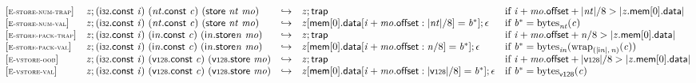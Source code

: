 $$
\begin{array}{@{}l@{}lcl@{}l@{}}
{[\textsc{\scriptsize E{-}store{-}num{-}trap}]} \quad & {\mathit{z}} ; (\mathsf{i{\scriptstyle32}}.\mathsf{const}~{\mathit{i}})~({\mathit{nt}}.\mathsf{const}~{\mathit{c}})~(\mathsf{store}~{\mathit{nt}}~{\mathit{mo}}) &\hookrightarrow& {\mathit{z}} ; \mathsf{trap} &\quad
  \mbox{if}~{\mathit{i}} + {\mathit{mo}}.\mathsf{offset} + {|{\mathit{nt}}|} / 8 > {|{{\mathit{z}}.\mathsf{mem}}{{}[0]}.\mathsf{data}|} \\
{[\textsc{\scriptsize E{-}store{-}num{-}val}]} \quad & {\mathit{z}} ; (\mathsf{i{\scriptstyle32}}.\mathsf{const}~{\mathit{i}})~({\mathit{nt}}.\mathsf{const}~{\mathit{c}})~(\mathsf{store}~{\mathit{nt}}~{\mathit{mo}}) &\hookrightarrow& {\mathit{z}}{}[\mathsf{mem}{}[0].\mathsf{data}{}[{\mathit{i}} + {\mathit{mo}}.\mathsf{offset} : {|{\mathit{nt}}|} / 8] = {{\mathit{b}}^\ast}] ; \epsilon &\quad
  \mbox{if}~{{\mathit{b}}^\ast} = {{\mathrm{bytes}}}_{{\mathit{nt}}}({\mathit{c}}) \\
{[\textsc{\scriptsize E{-}store{-}pack{-}trap}]} \quad & {\mathit{z}} ; (\mathsf{i{\scriptstyle32}}.\mathsf{const}~{\mathit{i}})~({\mathsf{i}}{{\mathit{n}}}.\mathsf{const}~{\mathit{c}})~({{\mathsf{i}}{{\mathit{n}}}.\mathsf{store}}{{\mathit{n}}}~{\mathit{mo}}) &\hookrightarrow& {\mathit{z}} ; \mathsf{trap} &\quad
  \mbox{if}~{\mathit{i}} + {\mathit{mo}}.\mathsf{offset} + {\mathit{n}} / 8 > {|{{\mathit{z}}.\mathsf{mem}}{{}[0]}.\mathsf{data}|} \\
{[\textsc{\scriptsize E{-}store{-}pack{-}val}]} \quad & {\mathit{z}} ; (\mathsf{i{\scriptstyle32}}.\mathsf{const}~{\mathit{i}})~({\mathsf{i}}{{\mathit{n}}}.\mathsf{const}~{\mathit{c}})~({{\mathsf{i}}{{\mathit{n}}}.\mathsf{store}}{{\mathit{n}}}~{\mathit{mo}}) &\hookrightarrow& {\mathit{z}}{}[\mathsf{mem}{}[0].\mathsf{data}{}[{\mathit{i}} + {\mathit{mo}}.\mathsf{offset} : {\mathit{n}} / 8] = {{\mathit{b}}^\ast}] ; \epsilon &\quad
  \mbox{if}~{{\mathit{b}}^\ast} = {{\mathrm{bytes}}}_{{{\mathit{i}}}{{\mathit{n}}}}({{{\mathrm{wrap}}}_{({|{\mathsf{i}}{{\mathit{n}}}|},\, {\mathit{n}})}}{({\mathit{c}})}) \\
{[\textsc{\scriptsize E{-}vstore{-}oob}]} \quad & {\mathit{z}} ; (\mathsf{i{\scriptstyle32}}.\mathsf{const}~{\mathit{i}})~(\mathsf{v{\scriptstyle128}}.\mathsf{const}~{\mathit{c}})~(\mathsf{v{\scriptstyle128}.store}~{\mathit{mo}}) &\hookrightarrow& {\mathit{z}} ; \mathsf{trap} &\quad
  \mbox{if}~{\mathit{i}} + {\mathit{mo}}.\mathsf{offset} + {|\mathsf{v{\scriptstyle128}}|} / 8 > {|{{\mathit{z}}.\mathsf{mem}}{{}[0]}.\mathsf{data}|} \\
{[\textsc{\scriptsize E{-}vstore{-}val}]} \quad & {\mathit{z}} ; (\mathsf{i{\scriptstyle32}}.\mathsf{const}~{\mathit{i}})~(\mathsf{v{\scriptstyle128}}.\mathsf{const}~{\mathit{c}})~(\mathsf{v{\scriptstyle128}.store}~{\mathit{mo}}) &\hookrightarrow& {\mathit{z}}{}[\mathsf{mem}{}[0].\mathsf{data}{}[{\mathit{i}} + {\mathit{mo}}.\mathsf{offset} : {|\mathsf{v{\scriptstyle128}}|} / 8] = {{\mathit{b}}^\ast}] ; \epsilon &\quad
  \mbox{if}~{{\mathit{b}}^\ast} = {{\mathrm{bytes}}}_{\mathsf{v{\scriptstyle128}}}({\mathit{c}}) \\
\end{array}
$$

